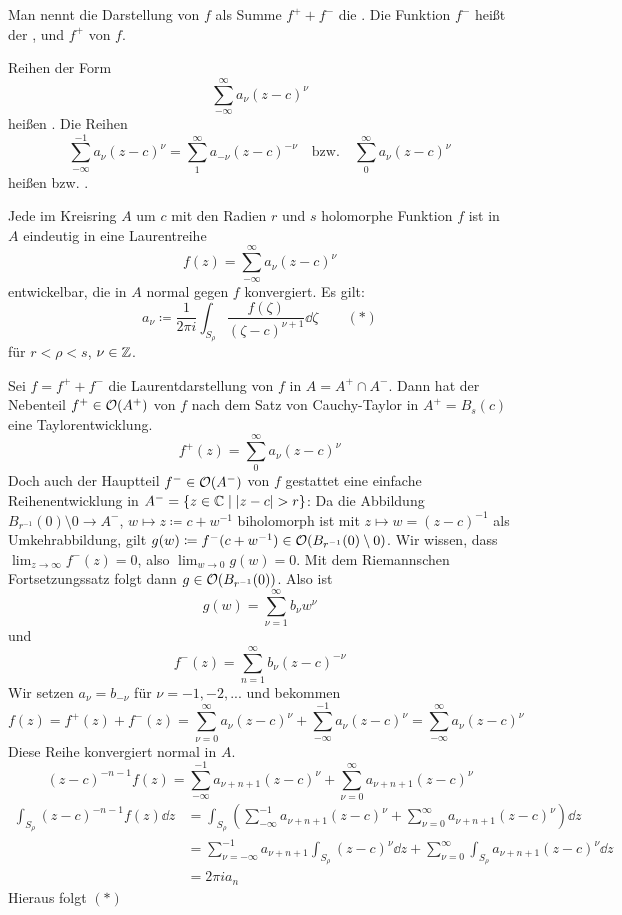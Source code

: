 Man nennt die Darstellung von $ f $ als Summe $ f^++f^- $ die . Die Funktion $ f^- $ hei\ss t der , und $ f^+ $  von $ f $.
\begin{definition}
	Reihen der Form
	\[ \sum_{-\infty}^{\infty}a_\nu(z-c)^\nu \]
	hei\ss en . Die Reihen
	\[ \sum_{-\infty}^{-1}a_\nu(z-c)^\nu=\sum_{1}^{\infty}a_{-\nu}(z-c)^{-\nu}\quad\text{bzw.}\quad\sum_0^\infty a_\nu(z-c)^\nu \]
	hei\ss en  bzw. .
\end{definition}
\begin{satz}
	Jede im Kreisring $ A $ um $ c $ mit den Radien $ r $ und $ s $ holomorphe Funktion $ f $ ist in $ A $ eindeutig in eine Laurentreihe
	\[ f(z)=\sum_{-\infty}^{\infty}a_\nu(z-c)^\nu \]
	entwickelbar, die in $ A $ normal gegen $ f $ konvergiert. Es gilt:
	\[ a_\nu\coloneqq\frac{1}{2\pi i}\int_{S_\rho}\frac{f(\zeta)}{(\zeta-c)^{\nu+1}}\dd\zeta\qquad(\ast) \]
	f\"ur $ r<\rho<s $, $ \nu\in\mathbb{Z} $.
\end{satz}
\begin{beweis}
	Sei $ f=f^++f^- $ die Laurentdarstellung von $ f $ in $ A=A^+\cap A^- $. Dann hat der Nebenteil $ f^+\in\mathcal O(A^+) $ von $ f $ nach dem Satz von Cauchy-Taylor in $ A^+=B_s(c) $ eine Taylorentwicklung.
	\[ f^+(z)=\sum_{0}^{\infty}a_\nu(z-c)^\nu \]
	Doch auch der Hauptteil $ f^-\in\mathcal O(A^-) $ von $ f $ gestattet eine einfache Reihenentwicklung in $ A^-=\lbrace z\in\C\mid |z-c|>r\rbrace $: Da die Abbildung $ B_{r^{-1}}(0)\setminus 0\rightarrow A^- $, $ w\mapsto z\coloneqq c+w^{-1} $ biholomorph ist mit $ z\mapsto w=(z-c)^{-1} $ als Umkehrabbildung, gilt $ g(w)\coloneqq f^-(c+w^{-1})\in\mathcal O(B_{r^{-1}}(0)\setminus 0) $. Wir wissen, dass $ \lim_{z\to\infty}f^-(z)=0 $, also $ \lim_{w\to 0}g(w)=0 $. Mit dem Riemannschen Fortsetzungssatz folgt dann $ g\in\mathcal O(B_{r^{-1}}(0)) $. Also ist
	\[ g(w)=\sum_{\nu=1}^\infty b_\nu w^\nu \]
	und
	\[ f^-(z)=\sum_{n=1}^\infty b_\nu(z-c)^{-\nu} \]
	Wir setzen $ a_\nu=b_{-\nu} $ f\"ur $ \nu=-1,-2,... $ und bekommen
	\[ f(z)=f^+(z)+f^-(z)=\sum_{\nu=0}^{\infty}a_\nu(z-c)^\nu+\sum_{-\infty}^{-1}a_\nu(z-c)^\nu=\sum_{-\infty}^{\infty}a_\nu(z-c)^\nu \]
	Diese Reihe konvergiert normal in $ A $.
	\[ (z-c)^{-n-1}f(z)=\sum_{-\infty}^{-1}a_{\nu+n+1}(z-c)^\nu+\sum_{\nu=0}^\infty a_{\nu+n+1}(z-c)^\nu \]
	\begin{align*} \int_{S_\rho}(z-c)^{-n-1}f(z)\dd z&=\int_{S_\rho}\left(\sum_{-\infty}^{-1}a_{\nu+n+1}(z-c)^\nu+\sum_{\nu=0}^\infty a_{\nu+n+1}(z-c)^\nu\right)\dd z\\&=\sum_{\nu=-\infty}^{-1}a_{\nu+n+1}\int_{S_\rho}(z-c)^{\nu}\dd z+\sum_{\nu=0}^{\infty}\int_{S_\rho}a_{\nu+n+1}(z-c)^{\nu}\dd z\\&=2\pi i a_n \end{align*}
	Hieraus folgt $ (\ast) $
\end{beweis}
